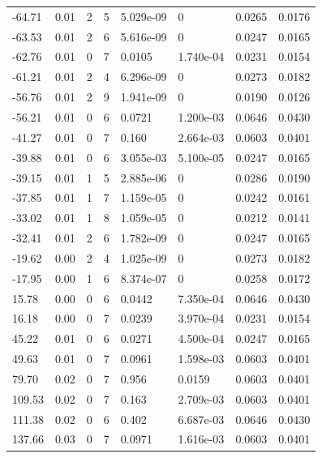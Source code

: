 \documentclass[preview]{standalone}
\begin{document}
{{\begin{tabular}{L{1.2cm}C{1.2cm} C{0.3cm}C{0.5cm} C{1.4cm}C{1.4cm} C{1.4cm}C{1.4cm}}
  -64.71  &  0.01  & 2     &  5 &  5.029e-09  & 0  & 0.0265 &  0.0176   \\ 
  -63.53  &  0.01  & 2     &  6 &  5.616e-09  & 0  & 0.0247 &  0.0165   \\ 
  -62.76  &  0.01  & 0     &  7 &  0.0105  & 1.740e-04  & 0.0231 &  0.0154   \\ 
  -61.21  &  0.01  & 2     &  4 &  6.296e-09  & 0  & 0.0273 &  0.0182   \\ 
  -56.76  &  0.01  & 2     &  9 &  1.941e-09  & 0  & 0.0190 &  0.0126   \\ 
  -56.21  &  0.01  & 0     &  6 &  0.0721  & 1.200e-03  & 0.0646 &  0.0430   \\ 
  -41.27  &  0.01  & 0     &  7 &  0.160  & 2.664e-03  & 0.0603 &  0.0401   \\ 
  -39.88  &  0.01  & 0     &  6 &  3.055e-03  & 5.100e-05  & 0.0247 &  0.0165   \\ 
  -39.15  &  0.01  & 1     &  5 &  2.885e-06  & 0  & 0.0286 &  0.0190   \\ 
  -37.85  &  0.01  & 1     &  7 &  1.159e-05  & 0  & 0.0242 &  0.0161   \\ 
  -33.02  &  0.01  & 1     &  8 &  1.059e-05  & 0  & 0.0212 &  0.0141   \\ 
  -32.41  &  0.01  & 2     &  6 &  1.782e-09  & 0  & 0.0247 &  0.0165   \\ 
  -19.62  &  0.00  & 2     &  4 &  1.025e-09  & 0  & 0.0273 &  0.0182   \\ 
  -17.95  &  0.00  & 1     &  6 &  8.374e-07  & 0  & 0.0258 &  0.0172   \\ 
  15.78  &  0.00  & 0     &  6 &  0.0442  & 7.350e-04  & 0.0646 &  0.0430   \\ 
  16.18  &  0.00  & 0     &  7 &  0.0239  & 3.970e-04  & 0.0231 &  0.0154   \\ 
  45.22  &  0.01  & 0     &  6 &  0.0271  & 4.500e-04  & 0.0247 &  0.0165   \\ 
  49.63  &  0.01  & 0     &  7 &  0.0961  & 1.598e-03  & 0.0603 &  0.0401   \\ 
  79.70  &  0.02  & 0     &  7 &  0.956  & 0.0159  & 0.0603 &  0.0401   \\ 
  109.53  &  0.02  & 0     &  7 &  0.163  & 2.709e-03  & 0.0603 &  0.0401   \\ 
  111.38  &  0.02  & 0     &  6 &  0.402  & 6.687e-03  & 0.0646 &  0.0430   \\ 
  137.66  &  0.03  & 0     &  7 &  0.0971  & 1.616e-03  & 0.0603 &  0.0401   \\ 

\end{tabular}}}
\end{document}
